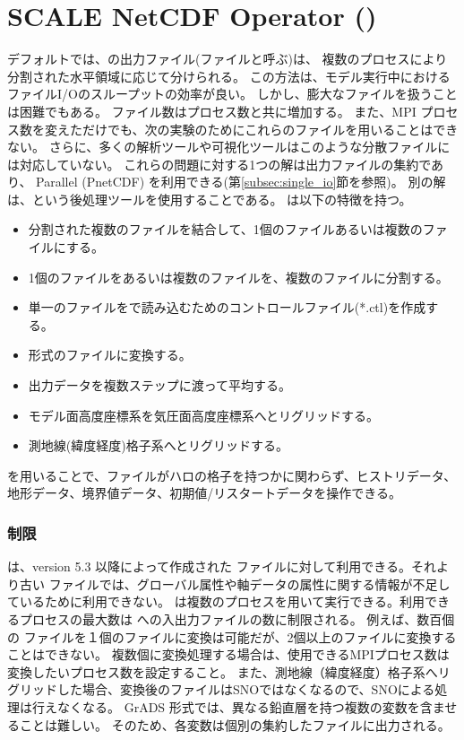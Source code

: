 \section{SCALE NetCDF Operator (\sno)} \label{sec:snoutil}

デフォルトでは、\scalerm の出力ファイル(\scalenetcdf ファイルと呼ぶ)は、
複数のプロセスにより分割された水平領域に応じて分けられる。
この方法は、モデル実行中におけるファイルI/Oのスループットの効率が良い。
しかし、膨大なファイルを扱うことは困難でもある。
ファイル数はプロセス数と共に増加する。
また、MPI プロセス数を変えただけでも、次の実験のためにこれらのファイルを用いることはできない。
さらに、多くの解析ツールや可視化ツールはこのような分散ファイルには対応していない。
これらの問題に対する1つの解は出力ファイルの集約であり、
Parallel \netcdf (PnetCDF) を利用できる(第\ref{subsec:single_io}節を参照)。
別の解は、\sno という後処理ツールを使用することである。
\sno は以下の特徴を持つ。

\begin{itemize}
 \item 分割された複数のファイルを結合して、1個のファイルあるいは複数のファイルにする。
 \item 1個のファイルをあるいは複数のファイルを、複数のファイルに分割する。
 \item 単一の{\Netcdf}ファイルを{\grads}で読み込むためのコントロールファイル(*.ctl)を作成する。
 \item \grads 形式のファイルに変換する。
 \item 出力データを複数ステップに渡って平均する。
 \item モデル面高度座標系を気圧面高度座標系へとリグリッドする。
 \item 測地線(緯度経度)格子系へとリグリッドする。
\end{itemize}

\sno を用いることで、ファイルがハロの格子を持つかに関わらず、ヒストリデータ、地形データ、境界値データ、初期値/リスタートデータを操作できる。

\subsubsection{制限}

\sno は、\scalelib version 5.3 以降によって作成された \scalenetcdf ファイルに対して利用できる。それより古い \scalenetcdf ファイルでは、グローバル属性や軸データの属性に関する情報が不足しているために利用できない。
\sno は複数のプロセスを用いて実行できる。利用できるプロセスの最大数は \sno への入出力ファイルの数に制限される。
例えば、数百個の \scalenetcdf ファイルを１個のファイルに変換は可能だが、2個以上のファイルに変換することはできない。
複数個に変換処理する場合は、使用できるMPIプロセス数は変換したいプロセス数を設定すること。
また、測地線（緯度経度）格子系へリグリッドした場合、変換後のファイルはSNOではなくなるので、SNOによる処理は行えなくなる。
GrADS 形式では、異なる鉛直層を持つ複数の変数を含ませることは難しい。
そのため、各変数は個別の集約したファイルに出力される。

